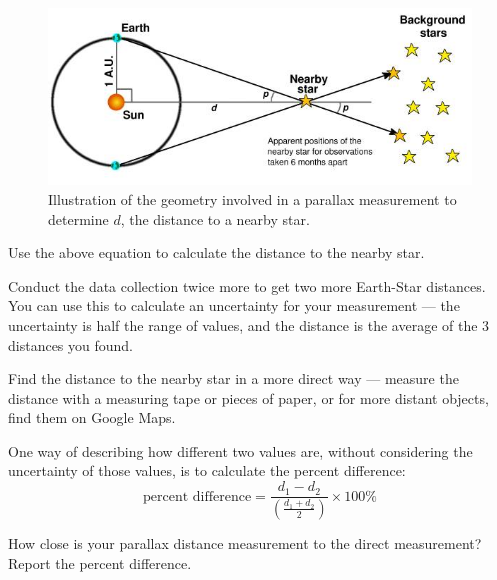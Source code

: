 \begin{figure}
	\includegraphics[width=\textwidth]{parallax/parallax-figure}
	\caption{Illustration of the geometry involved in a parallax measurement to determine $d$, the distance to a nearby star.}\label{par:fig:figure}
\end{figure}

\begin{steps}
	\item Use the above equation to calculate the distance to the nearby star.
	
	\item Conduct the data collection twice more to get two more Earth-Star distances. You can use this to calculate an uncertainty for your measurement --- the uncertainty is half the range of values, and the distance is the average of the 3 distances you found.
	
	\item Find the distance to the nearby star in a more direct way --- measure the distance with a measuring tape or pieces of paper, or for more distant objects, find them on Google Maps.
\end{steps}

One way of describing how different two values are, without considering the uncertainty of those values, is to calculate the percent difference:
\begin{equation}
\textrm{percent difference} = \frac{d_1 - d_2}{\left(\frac{d_1+d_2}{2}\right)} \times 100\%
\end{equation}

\begin{steps}	
	\item How close is your parallax distance measurement to the direct measurement? Report the percent difference.
\end{steps}

